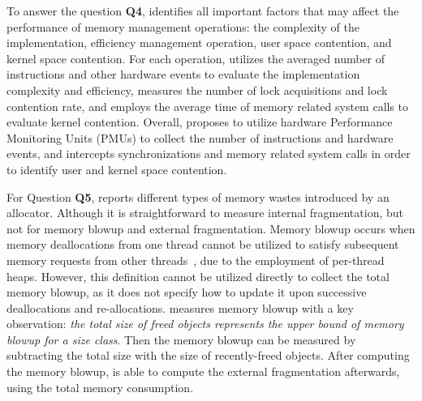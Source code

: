 To answer the question \textbf{Q4}, \MP{} identifies all important factors that may affect the performance of memory management operations: the complexity of the implementation, efficiency management operation, user space contention, and kernel space contention. For each operation, \MP{} utilizes the averaged number of instructions and other hardware events to evaluate the implementation complexity and efficiency, measures the number of lock acquisitions and lock contention rate, and employs the average time of memory related system calls to evaluate kernel contention. Overall, \MP{} proposes to utilize hardware Performance Monitoring Units (PMUs) to collect the number of instructions and hardware events, and intercepts synchronizations and memory related system calls in order to identify user and kernel space contention. 

For Question \textbf{Q5}, \MP{} reports different types of memory wastes introduced by an allocator. Although it is straightforward to measure internal fragmentation, but not for memory blowup and external fragmentation. Memory blowup occurs when memory deallocations from one thread cannot be utilized to satisfy subsequent memory requests from other threads~\cite{Hoard}, due to the employment of per-thread heaps. However, this definition cannot be utilized directly to collect the total memory blowup, as it does not specify how to update it upon successive deallocations and re-allocations. \MP{} measures memory blowup with a key observation: \textit{the total size of freed objects represents the upper bound of memory blowup for a size class}. Then the memory blowup can be measured by subtracting the total size with the size of recently-freed objects. After computing the memory blowup, \MP{} is able to compute the external fragmentation afterwards, using the total memory consumption. 



